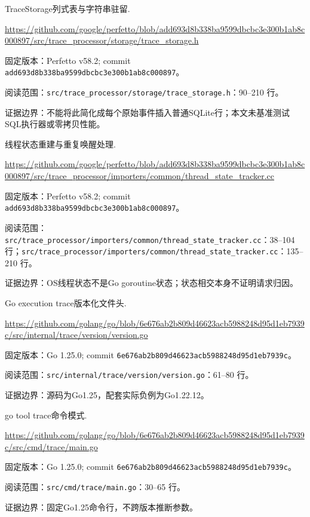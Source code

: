 \documentclass[UTF8,fontset=fandol,openany,11pt]{ctexbook}
\begin{document}
\begin{thebibliography}{999}
 TraceStorage列式表与字符串驻留.\par
\url{https://github.com/google/perfetto/blob/add693d8b338ba9599dbcbc3e300b1ab8c000897/src/trace_processor/storage/trace_storage.h}\par
{\small\raggedright 固定版本：Perfetto v58.2; commit \texttt{add693d8\allowbreak{}b338ba95\allowbreak{}99dbcbc3\allowbreak{}e300b1ab\allowbreak{}8c000897}。\par
阅读范围：\nolinkurl{src/trace_processor/storage/trace_storage.h}：90–210 行。\par
证据边界：不能将此简化成每个原始事件插入普通SQLite行；本文未基准测试SQL执行器或零拷贝性能。
}

 线程状态重建与重复唤醒处理.\par
\url{https://github.com/google/perfetto/blob/add693d8b338ba9599dbcbc3e300b1ab8c000897/src/trace_processor/importers/common/thread_state_tracker.cc}\par
{\small\raggedright 固定版本：Perfetto v58.2; commit \texttt{add693d8\allowbreak{}b338ba95\allowbreak{}99dbcbc3\allowbreak{}e300b1ab\allowbreak{}8c000897}。\par
阅读范围：\nolinkurl{src/trace_processor/importers/common/thread_state_tracker.cc}：38–104 行；\nolinkurl{src/trace_processor/importers/common/thread_state_tracker.cc}：135–210 行。\par
证据边界：OS线程状态不是Go goroutine状态；状态相交本身不证明请求归因。
}

 Go execution trace版本化文件头.\par
\url{https://github.com/golang/go/blob/6e676ab2b809d46623acb5988248d95d1eb7939c/src/internal/trace/version/version.go}\par
{\small\raggedright 固定版本：Go 1.25.0; commit \texttt{6e676ab2\allowbreak{}b809d466\allowbreak{}23acb598\allowbreak{}8248d95d\allowbreak{}1eb7939c}。\par
阅读范围：\nolinkurl{src/internal/trace/version/version.go}：61–80 行。\par
证据边界：源码为Go1.25，配套实际负例为Go1.22.12。
}

 go tool trace命令模式.\par
\url{https://github.com/golang/go/blob/6e676ab2b809d46623acb5988248d95d1eb7939c/src/cmd/trace/main.go}\par
{\small\raggedright 固定版本：Go 1.25.0; commit \texttt{6e676ab2\allowbreak{}b809d466\allowbreak{}23acb598\allowbreak{}8248d95d\allowbreak{}1eb7939c}。\par
阅读范围：\nolinkurl{src/cmd/trace/main.go}：30–65 行。\par
证据边界：固定Go1.25命令行，不跨版本推断参数。
}


\end{thebibliography}
\end{document}
